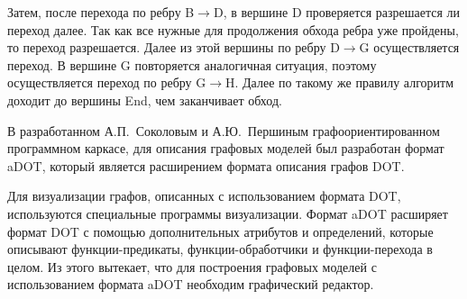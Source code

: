 Затем, после перехода по ребру \textsf{B$\rightarrow$D}, в вершине \textsf{D} проверяется разрешается ли переход далее. Так как все нужные для продолжения обхода ребра уже пройдены, то переход разрешается. Далее из этой вершины по ребру \textsf{D$\rightarrow$G} осуществляется переход. В вершине \textsf{G} повторяется аналогичная ситуация, поэтому осуществляется переход по ребру \textsf{G$\rightarrow$H}. Далее по такому же правилу алгоритм доходит до вершины \textsf{End}, чем заканчивает обход.

В разработанном А.П.~Соколовым и А.Ю.~Першиным графоориентированном программном каркасе, для описания графовых моделей был разработан формат aDOT, который является расширением формата описания графов DOT.

Для визуализации графов, описанных с использованием формата DOT, используются специальные программы визуализации. Формат aDOT расширяет формат DOT с помощью дополнительных атрибутов и определений, которые описывают функции-предикаты, функции-обработчики и функции-перехода в целом. Из этого вытекает, что для построения графовых моделей с использованием формата aDOT необходим графический редактор.